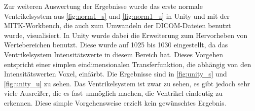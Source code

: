 Zur weiteren Auswertung der Ergebnisse wurde das erste normale Ventrikelsystem aus \autoref{fig:norm1_s} und \autoref{fig:norm1_u} in Unity und mit der MITK-Workbench, die auch zum Umwandeln der DICOM-Dateien benutzt wurde, visualisiert.
\newline
In Unity wurde dabei die Erweiterung zum Hervorheben von Wertebereichen benutzt. Diese wurde auf 1025 bis 1030 eingestellt, da das Ventrikelsystem Intensitätswerte in diesem Bereich hat. Dieses Vorgehen entspricht einer simplen eindimensionalen Transferfunktion, die abhängig von den Intensitätswerten Voxel, einfärbt.
Die Ergebnisse sind in \autoref{fig:unity_s} und \autoref{fig:unity_u} zu sehen. Das Ventrikelsystem ist zwar zu sehen, es gibt jedoch sehr viele Ausreißer, die es fast unmöglich machen, die Ventrikel eindeutig zu erkennen. Diese simple Vorgehensweise erzielt kein gewünschtes Ergebnis.


